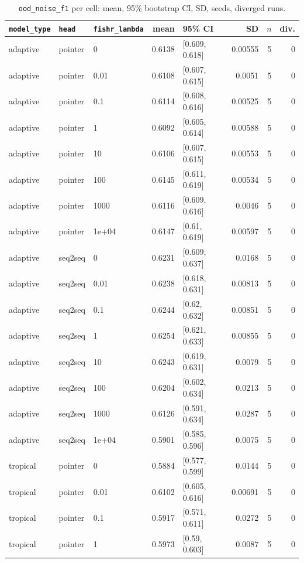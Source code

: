 \documentclass[10pt]{article}
\begin{document}
{\small
\begin{longtable}{lllrlrrr}
\caption{\texttt{ood\_noise\_f1} per cell: mean, 95\% bootstrap CI, SD, seeds, diverged runs.}\label{tab:summary-ood_noise_f1}\\
\toprule
\texttt{model\_type} & \texttt{head} & \texttt{fishr\_lambda} & mean & 95\% CI & SD & $n$ & div.\\
\midrule
\endhead
adaptive & pointer & 0 & 0.6138 & [0.609, 0.618] & 0.00555 & 5 & 0\\
adaptive & pointer & 0.01 & 0.6108 & [0.607, 0.615] & 0.0051 & 5 & 0\\
adaptive & pointer & 0.1 & 0.6114 & [0.608, 0.616] & 0.00525 & 5 & 0\\
adaptive & pointer & 1 & 0.6092 & [0.605, 0.614] & 0.00588 & 5 & 0\\
adaptive & pointer & 10 & 0.6106 & [0.607, 0.615] & 0.00553 & 5 & 0\\
adaptive & pointer & 100 & 0.6145 & [0.611, 0.619] & 0.00534 & 5 & 0\\
adaptive & pointer & 1000 & 0.6116 & [0.609, 0.616] & 0.0046 & 5 & 0\\
adaptive & pointer & 1e+04 & 0.6147 & [0.61, 0.619] & 0.00597 & 5 & 0\\
adaptive & seq2seq & 0 & 0.6231 & [0.609, 0.637] & 0.0168 & 5 & 0\\
adaptive & seq2seq & 0.01 & 0.6238 & [0.618, 0.631] & 0.00813 & 5 & 0\\
adaptive & seq2seq & 0.1 & 0.6244 & [0.62, 0.632] & 0.00851 & 5 & 0\\
adaptive & seq2seq & 1 & 0.6254 & [0.621, 0.633] & 0.00855 & 5 & 0\\
adaptive & seq2seq & 10 & 0.6243 & [0.619, 0.631] & 0.0079 & 5 & 0\\
adaptive & seq2seq & 100 & 0.6204 & [0.602, 0.634] & 0.0213 & 5 & 0\\
adaptive & seq2seq & 1000 & 0.6126 & [0.591, 0.634] & 0.0287 & 5 & 0\\
adaptive & seq2seq & 1e+04 & 0.5901 & [0.585, 0.596] & 0.0075 & 5 & 0\\
tropical & pointer & 0 & 0.5884 & [0.577, 0.599] & 0.0144 & 5 & 0\\
tropical & pointer & 0.01 & 0.6102 & [0.605, 0.616] & 0.00691 & 5 & 0\\
tropical & pointer & 0.1 & 0.5917 & [0.571, 0.611] & 0.0272 & 5 & 0\\
tropical & pointer & 1 & 0.5973 & [0.59, 0.603] & 0.0087 & 5 & 0\\

\end{longtable}}
\end{document}
